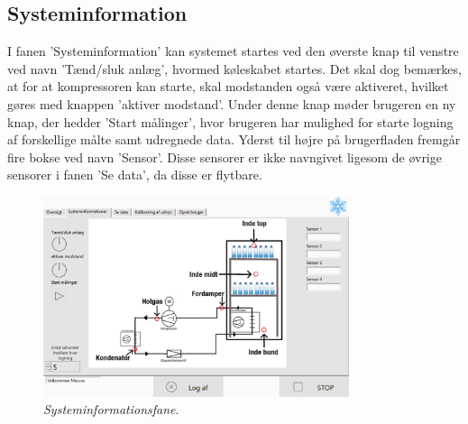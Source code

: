 \documentclass[../Hovedrapport.tex]{subfiles}
\begin{document}
\subsection*{Systeminformation}
I fanen 'Systeminformation' kan systemet startes ved den øverste knap til venstre ved navn 'Tænd/sluk anlæg', hvormed køleskabet startes.
Det skal dog bemærkes, at for at kompressoren kan starte, skal modstanden også være aktiveret, hvilket gøres med knappen 'aktiver modstand'.
Under denne knap møder brugeren en ny knap, der hedder 'Start målinger', hvor brugeren har mulighed for starte logning af forskellige målte samt udregnede data. Yderst til højre på brugerfladen fremgår fire bokse ved navn 'Sensor'. Disse sensorer er ikke navngivet ligesom de øvrige sensorer i fanen 'Se data', da disse er flytbare. 
\begin{figure}[H]
	\centering
	\includegraphics[width=0.80\textwidth]{Billeder/systeminfo.png}
	\caption{\textit{Systeminformationsfane}.}
	\label{fig:systeminformation}
\end{figure}
\vspace{-0.3cm}
\end{document}
